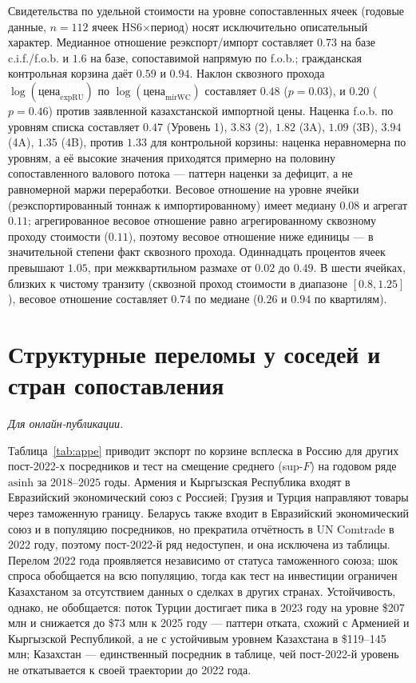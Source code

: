 \documentclass[12pt]{article}
\begin{document}
Свидетельства по удельной стоимости на уровне сопоставленных ячеек (годовые данные,
$n = 112$ ячеек HS6$\times$период) носят исключительно описательный характер. Медианное
отношение реэкспорт/импорт составляет $0.73$ на базе c.i.f./f.o.b. и $1.6$ на базе,
сопоставимой напрямую по f.o.b.; гражданская контрольная корзина даёт $0.59$ и $0.94$.
Наклон сквозного прохода $\log(\text{цена}_{\text{expRU}})$ по $\log(\text{цена}_{\text{mirWC}})$
составляет $0.48$ ($p = 0.03$), и $0.20$ ($p = 0.46$) против заявленной казахстанской
импортной цены. Наценка f.o.b. по уровням списка составляет $0.47$ (Уровень 1), $3.83$ (2),
$1.82$ (3A), $1.09$ (3B), $3.94$ (4A), $1.35$ (4B), против $1.33$ для контрольной корзины:
наценка неравномерна по уровням, а её высокие значения приходятся примерно на половину
сопоставленного валового потока — паттерн наценки за дефицит, а не равномерной маржи
переработки. Весовое отношение на уровне ячейки (реэкспортированный тоннаж к
импортированному) имеет медиану $0.08$ и агрегат $0.11$; агрегированное весовое отношение
равно агрегированному сквозному проходу стоимости ($0.11$), поэтому весовое отношение ниже
единицы — в значительной степени факт сквозного прохода. Одиннадцать процентов ячеек
превышают $1.05$, при межквартильном размахе от $0.02$ до $0.49$. В шести ячейках, близких к
чистому транзиту (сквозной проход стоимости в диапазоне $[0.8, 1.25]$), весовое отношение
составляет $0.74$ по медиане ($0.26$ и $0.94$ по квартилям).

\section{Структурные переломы у соседей и стран сопоставления}\label{app:breaks}
\emph{Для онлайн-публикации.}

\medskip
Таблица~\ref{tab:appe} приводит экспорт по корзине всплеска в Россию для других
пост-2022-х посредников и тест на смещение среднего (sup-$F$) на годовом ряде $\text{asinh}$
за $2018$--$2025$ годы. Армения и Кыргызская Республика входят в Евразийский экономический
союз с Россией; Грузия и Турция направляют товары через таможенную границу. Беларусь также
входит в Евразийский экономический союз и в популяцию посредников, но прекратила отчётность
в UN Comtrade в 2022 году, поэтому пост-2022-й ряд недоступен, и она исключена из таблицы.
Перелом 2022 года проявляется независимо от статуса таможенного союза; шок спроса
обобщается на всю популяцию, тогда как тест на инвестиции ограничен Казахстаном за
отсутствием данных о сделках в других странах. Устойчивость, однако, не обобщается: поток
Турции достигает пика в 2023 году на уровне \$207 млн и снижается до \$73 млн к 2025 году —
паттерн отката, схожий с Арменией и Кыргызской Республикой, а не с устойчивым уровнем
Казахстана в \$119--145 млн; Казахстан — единственный посредник в таблице, чей
пост-2022-й уровень не откатывается к своей траектории до 2022 года.
\end{document}
